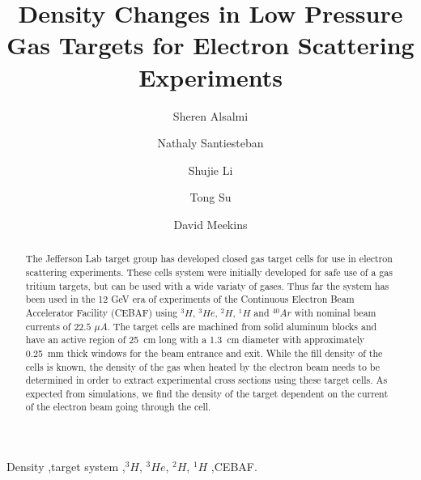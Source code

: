 \documentclass[final,5p,times,twocolumn]{elsarticle}
\begin{document}
\begin{frontmatter}



\title{Density Changes in Low Pressure Gas Targets for Electron Scattering Experiments}

\author[Kent]{Sheren Alsalmi}
\author[UNH]{Nathaly Santiesteban}
\author[UNH]{Shujie Li}
\author[Kent]{Tong Su}
\author[JLab]{David Meekins}

\address[Kent]{Kent State University}
\address[UNH]{University of New Hampshire}
\address[JLab]{Jefferson Lab}

\begin{abstract}
The Jefferson Lab target group has developed closed gas target cells for use in electron scattering experiments.  
These cells system were initially developed for
safe use of a gas tritium targets, but can be used with a wide variaty of gases.  Thus far the system has been used in the 12 GeV 
era of experiments of the Continuous Electron Beam Accelerator Facility (CEBAF) 
using $^{3}H$, $^{3}He$, $^{2}H$, $^{1}H$ and $^{40}Ar$ with nominal beam currents of 
$22.5$ $\mu A$.  The target cells are machined from solid  aluminum blocks and have an active region of 25~cm long with a 1.3~cm diameter 
with approximately 0.25~mm thick windows for the beam entrance and exit.   While the fill density of the cells is known, the density of the 
gas when heated by the electron beam needs to be determined in order to extract experimental cross sections using these target cells.  
As expected from simulations, we find the density of the target dependent on the current 
of the electron beam going through the cell.   
\end{abstract}

\begin{keyword}
Density \sep target system
\sep $^{3}H$, $^{3}He$, $^{2}H$, $^{1}H$
\sep CEBAF.
\end{keyword}
\end{frontmatter}
\end{document}

